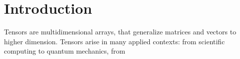 \chapter{Introduction}
Tensors are multidimensional arrays, that generalize matrices and vectors to higher dimension. Tensors arise in many applied contexts: from scientific computing to quantum mechanics, from 
